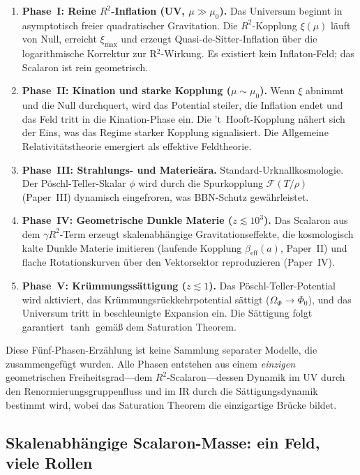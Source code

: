 \documentclass[aps,prd,twocolumn,superscriptaddress,nofootinbib]{revtex4-2}
\begin{document}
\begin{enumerate}
\item \textbf{Phase~I: Reine $R^2$-Inflation (UV, $\mu \gg \mu_0$).} Das Universum beginnt in asymptotisch freier quadratischer Gravitation. Die $R^2$-Kopplung $\xi(\mu)$ läuft von Null, erreicht $\xi_\mathrm{max}$ und erzeugt Quasi-de-Sitter-Inflation über die logarithmische Korrektur zur R$^2$-Wirkung. Es existiert kein Inflaton-Feld; das Scalaron ist rein geometrisch.

\item \textbf{Phase~II: Kination und starke Kopplung ($\mu \sim \mu_0$).} Wenn $\xi$ abnimmt und die Null durchquert, wird das Potential steiler, die Inflation endet und das Feld tritt in die Kination-Phase ein. Die 't~Hooft-Kopplung nähert sich der Eins, was das Regime starker Kopplung signalisiert. Die Allgemeine Relativitätstheorie emergiert als effektive Feldtheorie.

\item \textbf{Phase~III: Strahlungs- und Materieära.} Standard-Urknallkosmologie. Der Pöschl-Teller-Skalar $\phi$ wird durch die Spurkopplung $\mathcal{F}(T/\rho)$ (Paper~III) dynamisch eingefroren, was BBN-Schutz gewährleistet.

\item \textbf{Phase~IV: Geometrische Dunkle Materie ($z \lesssim 10^3$).} Das Scalaron aus dem $\gamma R^2$-Term erzeugt skalenabhängige Gravitationseffekte, die kosmologisch kalte Dunkle Materie imitieren (laufende Kopplung $\beta_\mathrm{eff}(a)$, Paper~II) und flache Rotationskurven über den Vektorsektor reproduzieren (Paper~IV).

\item \textbf{Phase~V: Krümmungssättigung ($z \lesssim 1$).} Das Pöschl-Teller-Potential wird aktiviert, das Krümmungsrückkehrpotential sättigt ($\Omega_\Phi \to \Phi_0$), und das Universum tritt in beschleunigte Expansion ein. Die Sättigung folgt garantiert $\tanh$ gemäß dem Saturation Theorem.
\end{enumerate}

Diese Fünf-Phasen-Erzählung ist keine Sammlung separater Modelle, die zusammengefügt wurden. Alle Phasen entstehen aus einem \textit{einzigen} geometrischen Freiheitsgrad---dem $R^2$-Scalaron---dessen Dynamik im UV durch den Renormierungsgruppenfluss und im IR durch die Sättigungsdynamik bestimmt wird, wobei das Saturation Theorem die einzigartige Brücke bildet.

\subsection{Skalenabhängige Scalaron-Masse: ein Feld, viele Rollen}
\label{sec:scalaron-mass}
\end{document}
